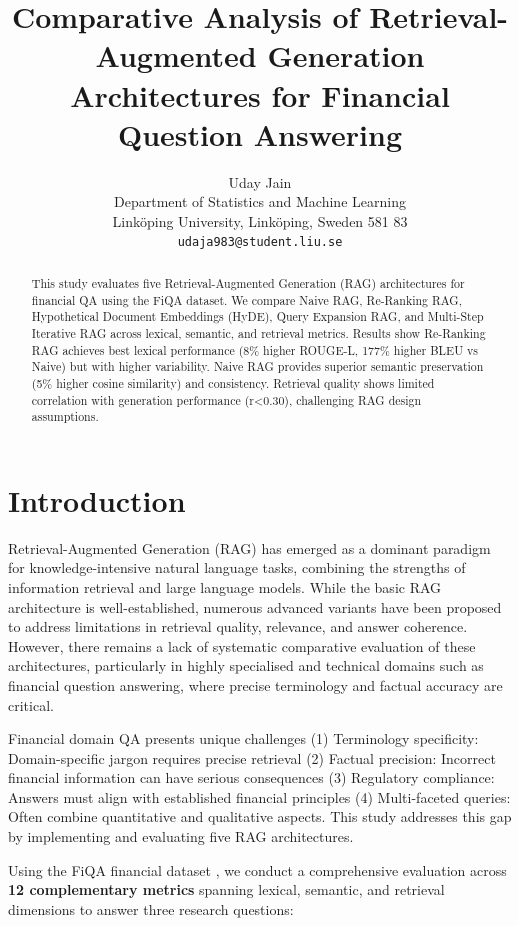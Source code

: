 \documentclass[11pt]{article}
\title{Comparative Analysis of Retrieval-Augmented Generation Architectures for Financial Question Answering}
\author{Uday Jain \\
  Department of Statistics and Machine Learning \\
  Linköping University, Linköping, Sweden 581 83 \\
  \texttt{udaja983@student.liu.se} }
\date{}
\begin{document}
\maketitle

\begin{abstract}
This study evaluates five Retrieval-Augmented Generation (RAG) architectures for 
financial QA using the FiQA dataset. We compare Naive RAG, Re-Ranking RAG, 
Hypothetical Document Embeddings (HyDE), Query Expansion RAG, and Multi-Step 
Iterative RAG across lexical, semantic, and retrieval metrics. Results show 
Re-Ranking RAG achieves best lexical performance (8\% higher ROUGE-L, 177\% 
higher BLEU vs Naive) but with higher variability. Naive RAG provides superior 
semantic preservation (5\% higher cosine similarity) and consistency. Retrieval 
quality shows limited correlation with generation performance (r<0.30), 
challenging RAG design assumptions.
\end{abstract}


\section{Introduction}

Retrieval-Augmented Generation (RAG) has emerged as a dominant paradigm for 
knowledge-intensive natural language tasks, combining the strengths of 
information retrieval and large language models. While the basic RAG 
architecture is well-established, numerous advanced variants have been proposed 
to address limitations in retrieval quality, relevance, and answer coherence. 
However, there remains a lack of systematic comparative evaluation of these 
architectures, particularly in highly specialised and technical domains such as 
financial question answering, where precise terminology and factual accuracy are critical.

Financial domain QA presents unique challenges (1) Terminology specificity: 
Domain-specific jargon requires precise retrieval (2) Factual precision: Incorrect 
financial information can have serious consequences (3) Regulatory compliance: 
Answers must align with established financial principles (4) Multi-faceted 
queries: Often combine quantitative and qualitative aspects. This study addresses 
this gap by implementing and evaluating five RAG architectures.

Using the FiQA financial dataset \citep{maia2018fiqa}, we conduct a comprehensive 
evaluation across \textbf{12 complementary metrics} spanning lexical, semantic, 
and retrieval dimensions to answer three research questions:
\end{document}
